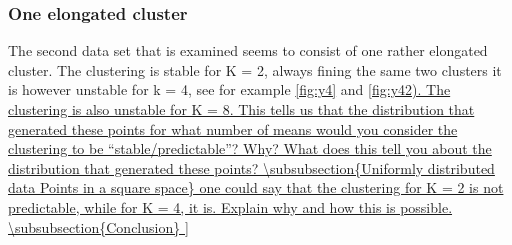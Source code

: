\documentclass[10pt,a4paper]{article}
\begin{document}
\subsubsection{One elongated cluster}
The second data set that is examined seems to consist of one rather elongated cluster. The clustering is stable for K = 2, always fining the same two clusters it is however unstable for k = 4, see for example \ref{fig:y4} and \ref{fig:y42). The clustering is also unstable for K = 8. This tells us that the distribution that generated these points 
for what number of means would you consider the clustering to be
“stable/predictable”? Why? What does this tell you about the distribution that
generated these points?
\subsubsection{Uniformly distributed data Points in a square space}

one could say that the clustering for K = 2 is not predictable,
while for K = 4, it is. Explain why and how this is possible.
\subsubsection{Conclusion}

}
\end{document}
